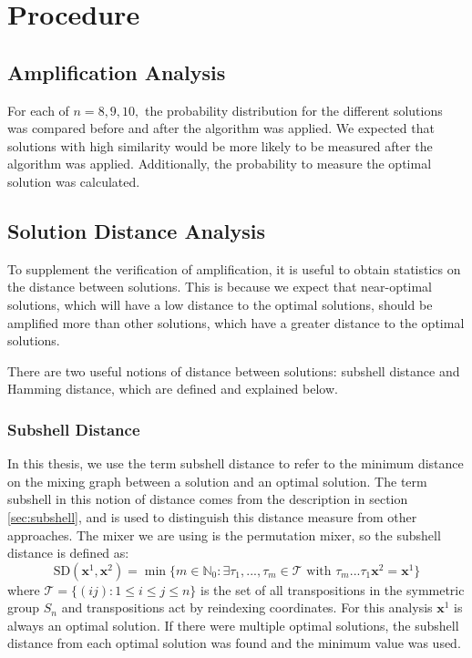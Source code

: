 \section{Procedure}
\subsection{Amplification Analysis}
For each of $n=8,9,10,$ the probability distribution for the different solutions was compared before and after the algorithm was applied. We expected that solutions with high similarity would be more likely to be measured after the algorithm was applied. Additionally, the probability to measure the optimal solution was calculated.

\subsection{Solution Distance Analysis}
To supplement the verification of amplification, it is useful to obtain statistics on the distance between solutions. This is because we expect that near-optimal solutions, which will have a low distance to the optimal solutions, should be amplified more than other solutions, which have a greater distance to the optimal solutions.

There are two useful notions of distance between solutions: subshell distance and Hamming distance, which are defined and explained below.

\subsubsection{Subshell Distance}
In this thesis, we use the term subshell distance to refer to the minimum distance on the mixing graph between a solution and an optimal solution. The term subshell in this notion of distance comes from the description in section \ref{sec:subshell}, and is used to distinguish this distance measure from other approaches. The mixer we are using is the permutation mixer, so the subshell distance is defined as:
$$\text{SD}(\mathbf{x}^1,\mathbf{x}^2)=\min \{m\in \mathbb{N}_0: \exists \tau_1,...,\tau_m \in \mathcal{T} \text{ with } \tau_m ... \tau_1 \mathbf{x}^2 = \mathbf{x}^1\}$$
where $\mathcal{T}=\{(ij):1 \leq i \leq j \leq n \}$ is the set of all transpositions in the symmetric group $S_n$ and transpositions act by reindexing coordinates. For this analysis $\mathbf{x}^1$ is always an optimal solution. If there were multiple optimal solutions, the subshell distance from each optimal solution was found and the minimum value was used.

